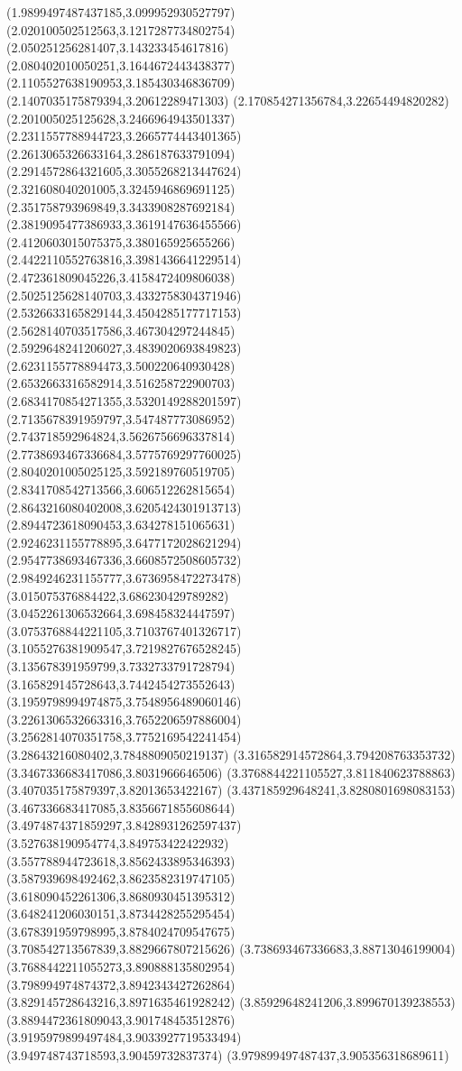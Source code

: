{(1.9899497487437185,3.099952930527797)
(2.020100502512563,3.1217287734802754)
(2.050251256281407,3.143233454617816)
(2.080402010050251,3.1644672443438377)
(2.1105527638190953,3.185430346836709)
(2.1407035175879394,3.20612289471303)
(2.170854271356784,3.22654494820282)
(2.201005025125628,3.2466964943501337)
(2.2311557788944723,3.2665774443401365)
(2.2613065326633164,3.286187633791094)
(2.2914572864321605,3.3055268213447624)
(2.321608040201005,3.3245946869691125)
(2.351758793969849,3.3433908287692184)
(2.3819095477386933,3.3619147636455566)
(2.4120603015075375,3.380165925655266)
(2.4422110552763816,3.3981436641229514)
(2.472361809045226,3.4158472409806038)
(2.5025125628140703,3.4332758304371946)
(2.5326633165829144,3.4504285177717153)
(2.5628140703517586,3.467304297244845)
(2.5929648241206027,3.4839020693849823)
(2.6231155778894473,3.500220640930428)
(2.6532663316582914,3.516258722900703)
(2.6834170854271355,3.5320149288201597)
(2.7135678391959797,3.547487773086952)
(2.743718592964824,3.5626756696337814)
(2.7738693467336684,3.5775769297760025)
(2.8040201005025125,3.592189760519705)
(2.8341708542713566,3.606512262815654)
(2.8643216080402008,3.6205424301913713)
(2.8944723618090453,3.634278151065631)
(2.9246231155778895,3.6477172028621294)
(2.9547738693467336,3.6608572508605732)
(2.9849246231155777,3.6736958472273478)
(3.015075376884422,3.686230429789282)
(3.0452261306532664,3.698458324447597)
(3.0753768844221105,3.7103767401326717)
(3.1055276381909547,3.7219827676528245)
(3.135678391959799,3.7332733791728794)
(3.165829145728643,3.7442454273552643)
(3.1959798994974875,3.7548956489060146)
(3.2261306532663316,3.7652206597886004)
(3.2562814070351758,3.7752169542241454)
(3.28643216080402,3.7848809050219137)
(3.316582914572864,3.794208763353732)
(3.3467336683417086,3.8031966646506)
(3.3768844221105527,3.811840623788863)
(3.407035175879397,3.82013653422167)
(3.437185929648241,3.8280801698083153)
(3.467336683417085,3.8356671855608644)
(3.4974874371859297,3.8428931262597437)
(3.527638190954774,3.849753422422932)
(3.557788944723618,3.8562433895346393)
(3.587939698492462,3.8623582319747105)
(3.618090452261306,3.8680930451395312)
(3.648241206030151,3.8734428255295454)
(3.678391959798995,3.8784024709547675)
(3.708542713567839,3.8829667807215626)
(3.738693467336683,3.88713046199004)
(3.7688442211055273,3.890888135802954)
(3.798994974874372,3.8942343427262864)
(3.829145728643216,3.8971635461928242)
(3.85929648241206,3.899670139238553)
(3.8894472361809043,3.901748453512876)
(3.9195979899497484,3.9033927719533494)
(3.949748743718593,3.90459732837374)
(3.979899497487437,3.905356318689611)
}
